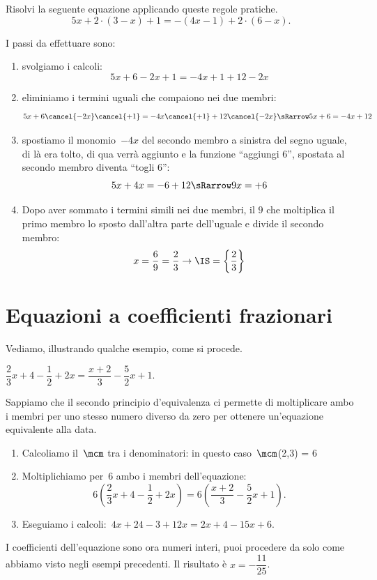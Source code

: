 \begin{problema}
 Risolvi la seguente equazione applicando queste regole pratiche.
 \[5x+2\cdot (3-x)+1=-(4x-1)+2\cdot (6-x).\]
\end{problema}

I passi da effettuare sono:
\begin{enumerate}
 \item svolgiamo i calcoli:
 \[5x+6-2x+1=-4x+1+12-2x\]
 \item eliminiamo i termini uguali che compaiono nei due membri:
 \[5x+6 \cancel{-2x}\cancel{+1}=-4x \cancel{+1}+12\cancel{-2x} \sRarrow 
5x+6=-4x+12\]
 \item spostiamo il monomio~\(-4x\) del secondo membro a sinistra del segno 
uguale, di là era tolto, di qua verrà aggiunto
e la funzione ``aggiungi \(6\)'', spostata al secondo membro diventa ``togli 
\(6\)'':
\[5x+4x=-6+12 \sRarrow 9x=+6\]
\item Dopo aver sommato i termini simili nei due membri, il 
\(9\) che moltiplica il primo membro lo sposto dall'altra parte dell'uguale e 
divide il secondo membro:
 \[x=\dfrac{6}{9} = \dfrac{2}{3}\to \IS =\left\{\dfrac{2}{3}\right\}\]
 \end{enumerate}

\section{Equazioni a coefficienti frazionari}
\label{sec:13_coefffraz}

Vediamo, illustrando qualche esempio, come si procede.

 \begin{esempio}
\(\dfrac{2}{3}x+4-\dfrac{1}{2}+2x=\dfrac{x+2}{3}-\dfrac{5}{2}x+1\).

Sappiamo che il secondo principio d'equivalenza ci
permette di moltiplicare ambo i membri per uno stesso numero diverso da
zero per ottenere un'equazione equivalente alla data.

\begin{enumerate}
 \item Calcoliamo il~\(\mcm\) tra i denominatori: in questo
caso~\(\mcm\)(2,3) = 6
 \item Moltiplichiamo per~6 ambo i membri
dell'equazione:
\[6\left(\dfrac{2}{3}x+4-\dfrac{1}{2}+2x\right)=6\left(\dfrac{x+2}{3}-\dfrac{5
}{
2}x+1\right).\]
 \item Eseguiamo i calcoli:~\(4x+24-3+12x=2x+4-15x+6\).
\end{enumerate}

I coefficienti dell'equazione sono ora numeri interi,
puoi procedere da solo come abbiamo visto negli esempi precedenti. Il 
risultato 
è \(x=-\dfrac{11}{25}\).
\end{esempio}

